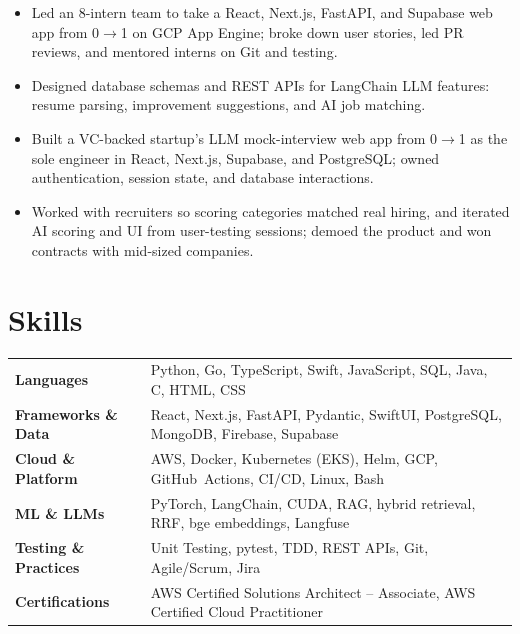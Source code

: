 \documentclass[11pt, letterpaper]{article}
\begin{document}
\vspace{1pt}
\begin{itemize}
  \item Led an 8-intern team to take a React, Next.js, FastAPI, and Supabase web app from 0$\to$1 on GCP App Engine; broke down user stories, led PR reviews, and mentored interns on Git and testing.
  \item Designed database schemas and REST APIs for LangChain LLM features: resume parsing, improvement suggestions, and AI job matching.
\end{itemize}

\vspace{1pt}
\begin{itemize}
  \item Built a VC-backed startup's LLM mock-interview web app from 0$\to$1 as the sole engineer in React, Next.js, Supabase, and PostgreSQL; owned authentication, session state, and database interactions.
  \item Worked with recruiters so scoring categories matched real hiring, and iterated AI scoring and UI from user-testing sessions; demoed the product and won contracts with mid-sized companies.
\end{itemize}

\section{Skills}
\begin{tabularx}{\textwidth}{@{}l @{\hspace{7pt}} >{\raggedright\arraybackslash}X@{}}
  \textbf{Languages} & Python, Go, TypeScript, Swift, JavaScript, SQL, Java, C, HTML, CSS \\[1pt]
  \textbf{Frameworks \& Data} & React, Next.js, FastAPI, Pydantic, SwiftUI, PostgreSQL, MongoDB, Firebase, Supabase \\[1pt]
  \textbf{Cloud \& Platform} & AWS, Docker, Kubernetes (EKS), Helm, GCP, GitHub~Actions, CI/CD, Linux, Bash \\[1pt]
  \textbf{ML \& LLMs} & PyTorch, LangChain, CUDA, RAG, hybrid retrieval, RRF, bge embeddings, Langfuse \\[1pt]
  \textbf{Testing \& Practices} & Unit Testing, pytest, TDD, REST APIs, Git, Agile/Scrum, Jira \\[1pt]
  \textbf{Certifications} & AWS Certified Solutions Architect -- Associate, AWS Certified Cloud Practitioner \\
\end{tabularx}
\end{document}
